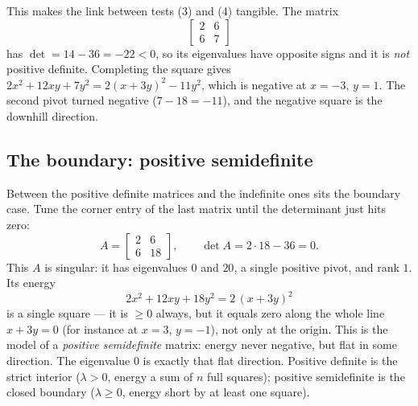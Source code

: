 This makes the link between tests (3) and (4) tangible. The matrix
\[
   \begin{bmatrix} 2 & 6\\ 6 & 7\end{bmatrix}
\]
has $\det=14-36=-22<0$, so its eigenvalues have opposite signs and it is \emph{not} positive definite. Completing the square gives $2x^2+12xy+7y^2=2(x+3y)^2-11y^2$, which is negative at $x=-3,\,y=1$. The second pivot turned negative ($7-18=-11$), and the negative square is the downhill direction.

\subsection{The boundary: positive semidefinite}

Between the positive definite matrices and the indefinite ones sits the boundary case. Tune the corner entry of the last matrix until the determinant just hits zero:
\[
   A=\begin{bmatrix} 2 & 6\\ 6 & 18\end{bmatrix},
   \qquad \det A=2\cdot18-36=0 .
\]
This $A$ is singular: it has eigenvalues $0$ and $20$, a single positive pivot, and rank $1$. Its energy
\[
   2x^2+12xy+18y^2=2\,(x+3y)^2
\]
is a single square --- it is $\ge 0$ always, but it equals zero along the whole line $x+3y=0$ (for instance at $x=3,\,y=-1$), not only at the origin. This is the model of a \emph{positive semidefinite} matrix: energy never negative, but flat in some direction. The eigenvalue $0$ is exactly that flat direction. Positive definite is the strict interior ($\lambda>0$, energy a sum of $n$ full squares); positive semidefinite is the closed boundary ($\lambda\ge0$, energy short by at least one square).


